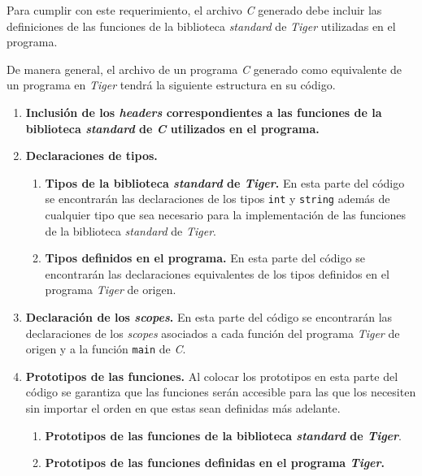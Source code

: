 \documentclass{article}
\begin{document}
Para cumplir con este requerimiento, el archivo \emph{C} generado debe incluir
las definiciones de las funciones de la biblioteca \emph{standard} de
\emph{Tiger} utilizadas en el programa.

De manera general, el archivo de un programa \textit{C} generado como
equivalente de un programa en \textit{Tiger} tendrá la siguiente estructura en
su código.

\begin{enumerate}
    \item \textbf{Inclusión de los \emph{headers} correspondientes a las
    funciones de la biblioteca \emph{standard} de \emph{C} utilizados en el
    programa.}

    \item \textbf{Declaraciones de tipos.}
    \begin{enumerate}
        \item \textbf{Tipos de la biblioteca \emph{standard} de \emph{Tiger}.}
        En esta parte del código se encontrarán las declaraciones de los tipos
        \texttt{int} y \texttt{string} además de cualquier tipo que sea
        necesario para la implementación de las funciones de la biblioteca
        \emph{standard} de \emph{Tiger}.
  		    
  		\item \textbf{Tipos definidos en el programa.} En esta parte del código se
  		encontrarán las declaraciones equivalentes de los tipos definidos en el
  		programa \emph{Tiger} de origen.
    \end{enumerate}
    
  	\item \textbf{Declaración de los \textit{scopes}.} En esta parte del código
  	se encontrarán las declaraciones de los \emph{scopes} asociados a cada función
  	del programa \textit{Tiger} de origen y a la función \texttt{main} de
  	\emph{C}.
  
  	\item \textbf{Prototipos de las funciones.} Al colocar los prototipos en
  	esta parte del código se garantiza que las funciones serán accesible para
  	las que los necesiten sin importar el orden en que estas sean definidas más
  	adelante.
    \begin{enumerate}
        \item \textbf{Prototipos de las funciones de la biblioteca
        \emph{standard} de \emph{Tiger}}.
        \item \textbf{Prototipos de las funciones definidas en el programa
        \emph{Tiger}.}
    \end{enumerate}
    

\end{enumerate}
\end{document}
